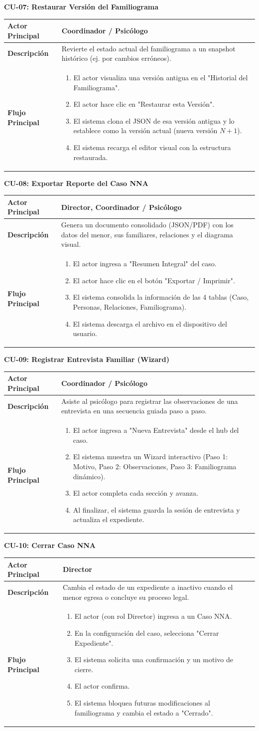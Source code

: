\documentclass[12pt]{article}
\newcommand{\CasoDeUso}[5]{
    \vspace{1.5em}\noindent\textcolor{ipnGuinda}{\textbf{\Large CU-#1: #2}}\par\vspace{0.8em}
    \renewcommand{\arraystretch}{1.3}
    \begin{tabular}{|>{\columncolor{tablaHeader}\bfseries}p{3.5cm}|p{11.5cm}|}
    \hline
    Actor Principal & #3 \\
    \hline
    Descripción & #4 \\
    \hline
    Flujo Principal & #5 \\
    \hline
    \end{tabular}\vspace{1.5em}
}
\begin{document}
\CasoDeUso{07}{Restaurar Versión del Familiograma}
{Coordinador / Psicólogo}
{Revierte el estado actual del familiograma a un snapshot histórico (ej. por cambios erróneos).}
{
\begin{enumerate}
    \item El actor visualiza una versión antigua en el "Historial del Familiograma".
    \item El actor hace clic en "Restaurar esta Versión".
    \item El sistema clona el JSON de esa versión antigua y lo establece como la versión actual (nueva versión $N+1$).
    \item El sistema recarga el editor visual con la estructura restaurada.
\end{enumerate}
}

\CasoDeUso{08}{Exportar Reporte del Caso NNA}
{Director, Coordinador / Psicólogo}
{Genera un documento consolidado (JSON/PDF) con los datos del menor, sus familiares, relaciones y el diagrama visual.}
{
\begin{enumerate}
    \item El actor ingresa a "Resumen Integral" del caso.
    \item El actor hace clic en el botón "Exportar / Imprimir".
    \item El sistema consolida la información de las 4 tablas (Caso, Personas, Relaciones, Familiograma).
    \item El sistema descarga el archivo en el dispositivo del usuario.
\end{enumerate}
}

\CasoDeUso{09}{Registrar Entrevista Familiar (Wizard)}
{Coordinador / Psicólogo}
{Asiste al psicólogo para registrar las observaciones de una entrevista en una secuencia guiada paso a paso.}
{
\begin{enumerate}
    \item El actor ingresa a "Nueva Entrevista" desde el hub del caso.
    \item El sistema muestra un Wizard interactivo (Paso 1: Motivo, Paso 2: Observaciones, Paso 3: Familiograma dinámico).
    \item El actor completa cada sección y avanza.
    \item Al finalizar, el sistema guarda la sesión de entrevista y actualiza el expediente.
\end{enumerate}
}

\CasoDeUso{10}{Cerrar Caso NNA}
{Director}
{Cambia el estado de un expediente a inactivo cuando el menor egresa o concluye su proceso legal.}
{
\begin{enumerate}
    \item El actor (con rol Director) ingresa a un Caso NNA.
    \item En la configuración del caso, selecciona "Cerrar Expediente".
    \item El sistema solicita una confirmación y un motivo de cierre.
    \item El actor confirma.
    \item El sistema bloquea futuras modificaciones al familiograma y cambia el estado a "Cerrado".
\end{enumerate}
}
\end{document}
